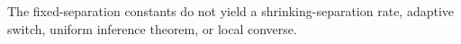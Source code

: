 The fixed-separation constants do not yield a shrinking-separation rate, adaptive switch, uniform inference theorem, or local converse.
